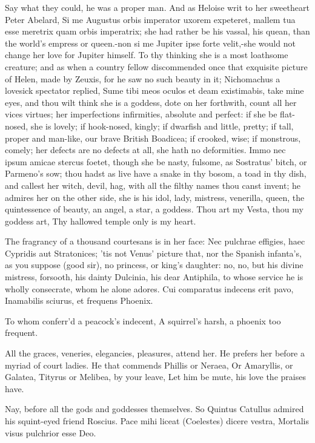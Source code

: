 {Say what they could, he was a proper man. And as Heloise writ to her
sweetheart Peter Abelard, Si me Augustus orbis imperator uxorem
expeteret, mallem tua esse meretrix quam orbis imperatrix; she had
rather be his vassal, his quean, than the world's empress or queen.-non
si me Jupiter ipse forte velit,-she would not change her love for
Jupiter himself.
To thy thinking she is a most loathsome creature; and as when a country
fellow discommended once that exquisite picture of Helen, made by
Zeuxis, for he saw no such beauty in it; Nichomachus a lovesick
spectator replied, Sume tibi meos oculos et deam existimabis, take mine
eyes, and thou wilt think she is a goddess, dote on her forthwith,
count all her vices virtues; her imperfections infirmities, absolute
and perfect: if she be flat-nosed, she is lovely; if hook-nosed,
kingly; if dwarfish and little, pretty; if tall, proper and man-like,
our brave British Boadicea; if crooked, wise; if monstrous, comely; her
defects are no defects at all, she hath no deformities. Immo nec ipsum
amicae stercus foetet, though she be nasty, fulsome, as Sostratus'
bitch, or Parmeno's sow; thou hadst as live have a snake in thy bosom,
a toad in thy dish, and callest her witch, devil, hag, with all the
filthy names thou canst invent; he admires her on the other side, she
is his idol, lady, mistress, venerilla, queen, the quintessence
of beauty, an angel, a star, a goddess.
Thou art my Vesta, thou my goddess art,
Thy hallowed temple only is my heart.

The fragrancy of a thousand courtesans is in her face: Nec
pulchrae effigies, haec Cypridis aut Stratonices; 'tis not Venus'
picture that, nor the Spanish infanta's, as you suppose (good sir), no
princess, or king's daughter: no, no, but his divine mistress,
forsooth, his dainty Dulcinia, his dear Antiphila, to whose service he
is wholly consecrate, whom he alone adores.
Cui comparatus indecens erit pavo,
Inamabilis sciurus, et frequens Phoenix.

To whom conferr'd a peacock's indecent,
A squirrel's harsh, a phoenix too frequent.

All the graces, veneries, elegancies, pleasures, attend her. He prefers
her before a myriad of court ladies.
He that commends Phillis or Neraea,
Or Amaryllis, or Galatea,
Tityrus or Melibea, by your leave,
Let him be mute, his love the praises have.

Nay, before all the gods and goddesses themselves. So Quintus
Catullus admired his squint-eyed friend Roscius.
Pace mihi liceat (Coelestes) dicere vestra,
Mortalis visus pulchrior esse Deo.

}
